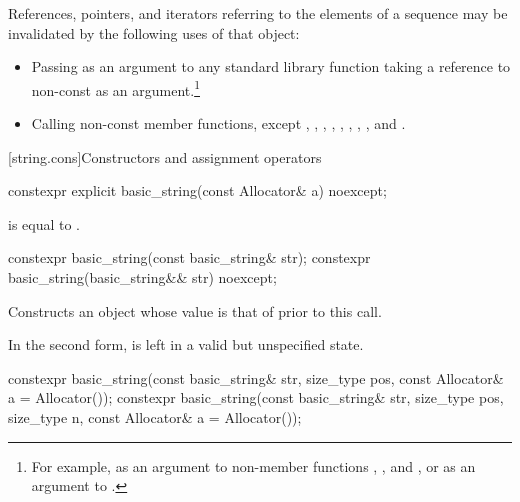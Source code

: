 \pnum
References, pointers, and iterators referring to the elements of a
 sequence may be
invalidated by the following uses of that  object:

\begin{itemize}
\item Passing as an argument to any standard library function taking a reference to non-const
 as an argument.\footnote{For example, as an argument to non-member
functions ,
, and , or as
an argument to .}

\item Calling non-const member functions, except
,
,
,
,
,
,
,
,
and
.
\end{itemize}

[string.cons]{Constructors and assignment operators}

%
\begin{itemdecl}
constexpr explicit basic_string(const Allocator& a) noexcept;
\end{itemdecl}

\begin{itemdescr}

\pnum
\ensures
{} is equal to .
\end{itemdescr}

%
\begin{itemdecl}
constexpr basic_string(const basic_string& str);
constexpr basic_string(basic_string&& str) noexcept;
\end{itemdecl}

\begin{itemdescr}
\pnum
\effects
Constructs an object whose
value is that of  prior to this call.

\pnum
\remarks
In the second form,  is left in a valid but unspecified state.
\end{itemdescr}

%
\begin{itemdecl}
constexpr basic_string(const basic_string& str, size_type pos,
                       const Allocator& a = Allocator());
constexpr basic_string(const basic_string& str, size_type pos, size_type n,
                       const Allocator& a = Allocator());
\end{itemdecl}

